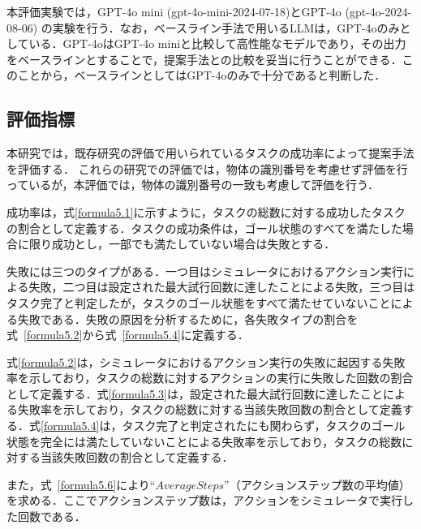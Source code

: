 本評価実験では，GPT-4o mini (gpt-4o-mini-2024-07-18)とGPT-4o (gpt-4o-2024-08-06) の実験を行う．なお，ベースライン手法で用いるLLMは，GPT-4oのみとしている．GPT-4oはGPT-4o miniと比較して高性能なモデルであり，その出力をベースラインとすることで，提案手法との比較を妥当に行うことができる．このことから，ベースラインとしてはGPT-4oのみで十分であると判断した．

\subsection{評価指標}\label{sec5.3}

本研究では，既存研究\cite{ALFRED20,song2023llm}の評価で用いられているタスクの成功率によって提案手法を評価する．
これらの研究での評価では，物体の識別番号を考慮せず評価を行っているが，本評価では，物体の識別番号の一致も考慮して評価を行う．

成功率は，式\ref{formula5.1}に示すように，タスクの総数に対する成功したタスクの割合として定義する．タスクの成功条件は，ゴール状態のすべてを満たした場合に限り成功とし，一部でも満たしていない場合は失敗とする．

失敗には三つのタイプがある．一つ目はシミュレータにおけるアクション実行による失敗，二つ目は設定された最大試行回数に達したことによる失敗，三つ目はタスク完了と判定したが，タスクのゴール状態をすべて満たせていないことによる失敗である．失敗の原因を分析するために，各失敗タイプの割合を式~\ref{formula5.2}から式~\ref{formula5.4}に定義する．

式\ref{formula5.2}は，シミュレータにおけるアクション実行の失敗に起因する失敗率を示しており，タスクの総数に対するアクションの実行に失敗した回数の割合として定義する．式\ref{formula5.3}は，設定された最大試行回数に達したことによる失敗率を示しており，タスクの総数に対する当該失敗回数の割合として定義する．式\ref{formula5.4}は，タスク完了と判定されたにも関わらず，タスクのゴール状態を完全には満たしていないことによる失敗率を示しており，タスクの総数に対する当該失敗回数の割合として定義する．

また，式~\ref{formula5.6}により``$AverageSteps$''（アクションステップ数の平均値）を求める．ここでアクションステップ数は，アクションをシミュレータで実行した回数である．


